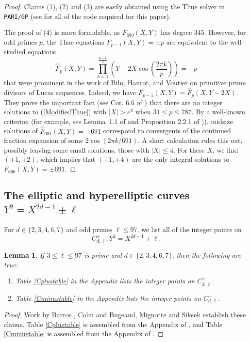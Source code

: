 \documentclass[12pt]{amsart}
\newtheorem{lem}{Lemma}[section]
\newcommand{\?}{\color{red}?}
\numberwithin{equation}{section}
\begin{document}
\begin{proof} Claims (1), (2) and (3) are easily obtained using the Thue solver in \texttt{PARI/GP} \cite{pari}
(see \cite{github} for all of the code required for this paper).

The proof of (4) is more formidable, as $F_{690}(X,Y)$ has degree 345. However, for odd primes $p$, the Thue equations $F_{p-1}(X,Y)=\pm p$
 are equivalent to the well-studied equations
\begin{equation}\label{ModifiedThue}
\widehat{F}_p(X,Y)=\prod_{k=1}^{\frac{p-1}{2}}\left(Y-2X\cos\left(\frac{2\pi k}{p}\right)\right)=\pm p
\end{equation}
that were prominent in the work of Bilu, Hanrot, and Voutier on primitive prime divisors of Lucas sequences. 
Indeed, we have  $F_{p-1}(X,Y)=\widehat{F}_p(X,Y-2X).$
They prove the important  fact
(see Cor. 6.6 of \cite{BHV}) that there are no integer solutions to (\ref{ModifiedThue})
with $|X|>e^8$  when $31\leq p\leq 787.$ By a well-known criterion (for example, see Lemma~1.1 of \cite{TW} and Proposition 2.2.1 of \cite{BH96})), midsize solutions of $\widehat{F}_{691}(X,Y)=\pm 691$  correspond to convergents of the continued fraction expansion of some 
$2\cos(2\pi k/691).$  A short calculation rules this out, possibly leaving some small solutions, those  with
 $|X|\leq 4$.  For these $X$, we find $(\pm 1, \pm 2)$, which implies that
$(\pm 1, \pm 4)$ are the only integral solutions to $F_{690}(X,Y)=\pm 691.$
\end{proof}

\subsection{The elliptic and hyperelliptic curves $Y^2=X^{2d-1}\pm \ell$}



For  $d\in \{2, 3, 4 ,6, 7\}$ and odd primes $\ell  \leq 97$, we list all of the integer points on
\begin{equation}
C_{d,\ell}^{\pm}: Y^2=X^{2d-1}\pm \ell.
\end{equation}

\begin{lem}\label{HYPER} If $3\leq \ell \leq 97$ is prime and $d\in \{2, 3, 4, 6, 7\}$, then the following are true:
\begin{enumerate}
\item Table \ref{Cplustable} in the Appendix lists the integer points on $C_{d,\ell}^{+}.$
\item Table \ref{Cminustable} in the Appendix lists the integer points on $C_{d,\ell}^{-}.$
 \end{enumerate}
\end{lem}
\begin{proof}
Work by Barros \cite{Barros}, Cohn \cite{Cohn} and Bugeaud, Mignotte and Siksek \cite{BMS}
establish these claims. Table \ref{Cplustable} is assembled from the Appendix of \cite{Barros}, and Table \ref{Cminustable} is assembled from the Appendix of \cite{BMS}.
\end{proof}
\end{document}
